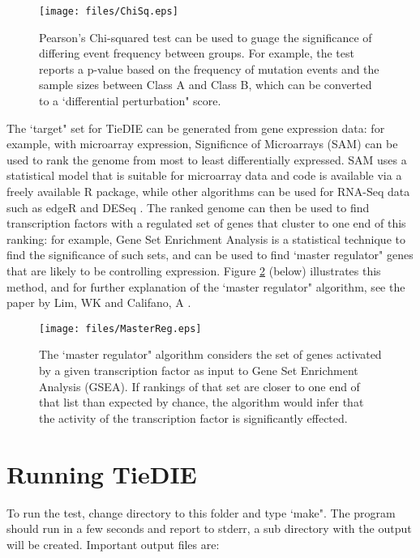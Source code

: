 \documentclass[11pt]{report}
\begin{document}
\begin{figure}[h]
    \texttt{[image: files/ChiSq.eps]}
	\caption{Pearson's Chi-squared test can be used to guage the significance of differing event frequency between groups. For example, the test reports a p-value based
	on the frequency of mutation events and the sample sizes between Class A and Class B, which can be converted to a `differential perturbation" score. }
    \label{fig:chisq}
\end{figure}

\clearpage

\noindent The `target" set for TieDIE can be generated from gene expression data: for example, with microarray expression, Significnce of Microarrays (SAM) \cite{SAM} can be used to rank the genome from most to least differentially expressed. SAM uses a statistical model that is suitable for microarray data and code is available via a freely available R package, while other algorithms can be used for RNA-Seq data
such as edgeR \cite{edgeR} and DESeq \cite{DESeq}. The ranked genome can then be used to find transcription factors with a regulated 
set of genes that cluster to one end of this ranking: for example, Gene Set Enrichment Analysis \cite{Subramanian05} is a statistical 
technique to find the significance of such sets, and can be used to find `master regulator" genes that are likely to be controlling expression. Figure \ref{fig:masterreg} (below) illustrates this method, and for further explanation of the `master regulator" algorithm, see the paper by Lim, WK and Califano, A \cite{MR_Califano}. 


\begin{figure}[h]
    \texttt{[image: files/MasterReg.eps]}
	\caption{The `master regulator" algorithm considers the set of genes activated by a given transcription factor as input to Gene Set Enrichment Analysis (GSEA). If rankings
	of that set are closer to one end of that list than expected by chance, the algorithm would infer that the activity of the transcription factor is significantly effected.} 
    \label{fig:masterreg}
\end{figure}

\clearpage

\section{Running TieDIE}

\noindent To run the test, change directory to this folder and type `make". The program should run in a few seconds and report 
to stderr, a sub directory with the output will be created. Important output files are:
\end{document}
